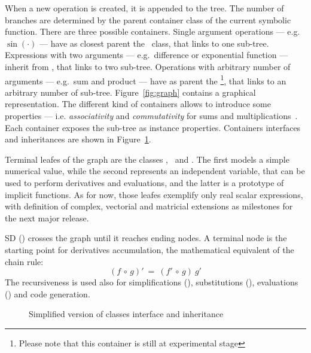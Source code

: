 When a new operation is created, it is appended to the tree. The number of branches are determined by the parent container class of the current symbolic function. There are three possible containers. Single argument operations --- e.g. $\sin(\cdot)$ --- have as closest parent the \CASOp~class, that links to one sub-tree. Expressions with two arguments --- e.g.\ difference or exponential function --- inherit from \CASBinaryOp, that links to two sub-tree. Operations with arbitrary number of arguments --- e.g.\ sum and product --- have as parent the \CASNaryOp\footnote{Please note that this container is still at experimental stage}, that links to an arbitrary number of sub-tree. Figure~\ref{fig:graph} contains a graphical representation. The different kind of containers allows to introduce some properties --- i.e. \emph{associativity} and \emph{commutativity} for sums and multiplications~\cite{cohen2003computer}. Each container exposes the sub-tree as instance properties. Containers interfaces and inheritances are shown in Figure~\ref{fig:uml-container}. %

Terminal leafes of the graph are the classes \CASConstant, \CASVariable~and \CASFunction. The first models a simple numerical value, while the second represents an independent variable, that can be used to perform derivatives and evaluations, and the latter is a prototype of implicit functions. As for now, those leafes exemplify only real scalar expressions, with definition of complex, vectorial and matricial extensions as milestones for the next major release.

SD (\CASOpdiff) crosses the graph until it reaches ending nodes. A terminal node is the starting point for derivatives accumulation, the mathematical equivalent of the chain rule:
\begin{equation}
\left( f  \, \circ \, g \right)' \: = \:
\left( f' \, \circ \, g \right) \: g'
\end{equation}
The recursiveness is used also for simplifications (\CASOpsimplify), substitutions (\CASOpsubs), evaluations (\CASOpcall) and code generation.

\begin{figure}[ht!]
\centering

\caption{\label{fig:uml-container}Simplified version of classes interface and inheritance}
\end{figure}

